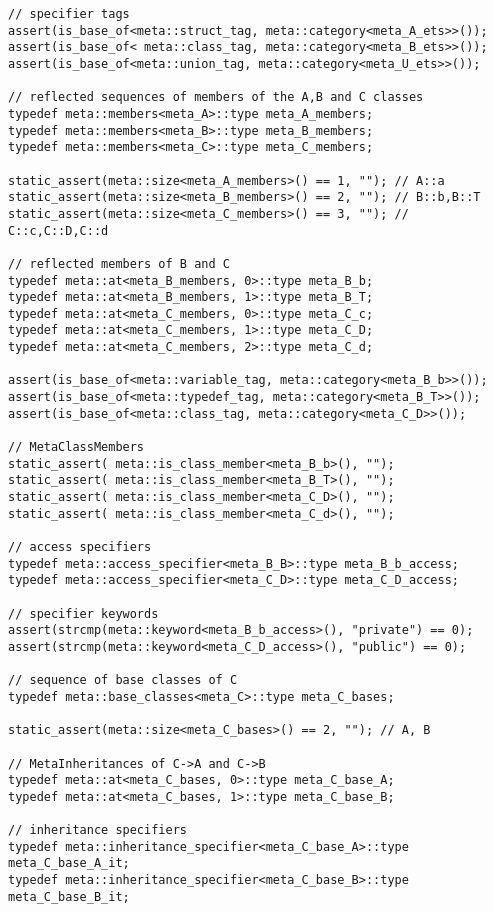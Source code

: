 \begin{verbatim}
// specifier tags
assert(is_base_of<meta::struct_tag, meta::category<meta_A_ets>>());
assert(is_base_of< meta::class_tag, meta::category<meta_B_ets>>());
assert(is_base_of<meta::union_tag, meta::category<meta_U_ets>>());

// reflected sequences of members of the A,B and C classes
typedef meta::members<meta_A>::type meta_A_members;
typedef meta::members<meta_B>::type meta_B_members;
typedef meta::members<meta_C>::type meta_C_members;

static_assert(meta::size<meta_A_members>() == 1, ""); // A::a
static_assert(meta::size<meta_B_members>() == 2, ""); // B::b,B::T
static_assert(meta::size<meta_C_members>() == 3, ""); // C::c,C::D,C::d

// reflected members of B and C
typedef meta::at<meta_B_members, 0>::type meta_B_b;
typedef meta::at<meta_B_members, 1>::type meta_B_T;
typedef meta::at<meta_C_members, 0>::type meta_C_c;
typedef meta::at<meta_C_members, 1>::type meta_C_D;
typedef meta::at<meta_C_members, 2>::type meta_C_d;

assert(is_base_of<meta::variable_tag, meta::category<meta_B_b>>());
assert(is_base_of<meta::typedef_tag, meta::category<meta_B_T>>());
assert(is_base_of<meta::class_tag, meta::category<meta_C_D>>());

// MetaClassMembers
static_assert( meta::is_class_member<meta_B_b>(), "");
static_assert( meta::is_class_member<meta_B_T>(), "");
static_assert( meta::is_class_member<meta_C_D>(), "");
static_assert( meta::is_class_member<meta_C_d>(), "");

// access specifiers
typedef meta::access_specifier<meta_B_B>::type meta_B_b_access;
typedef meta::access_specifier<meta_C_D>::type meta_C_D_access;

// specifier keywords
assert(strcmp(meta::keyword<meta_B_b_access>(), "private") == 0);
assert(strcmp(meta::keyword<meta_C_D_access>(), "public") == 0);

// sequence of base classes of C
typedef meta::base_classes<meta_C>::type meta_C_bases;

static_assert(meta::size<meta_C_bases>() == 2, ""); // A, B

// MetaInheritances of C->A and C->B
typedef meta::at<meta_C_bases, 0>::type meta_C_base_A;
typedef meta::at<meta_C_bases, 1>::type meta_C_base_B;

// inheritance specifiers
typedef meta::inheritance_specifier<meta_C_base_A>::type meta_C_base_A_it;
typedef meta::inheritance_specifier<meta_C_base_B>::type meta_C_base_B_it;


\end{verbatim}

